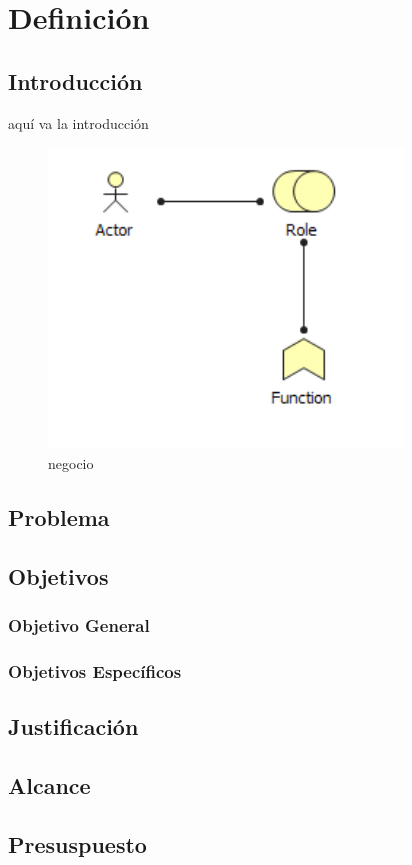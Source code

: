\chapter{Definición}


\section{Introducción}
aquí va la introducción \cite{bol_arq,bol_sw,IC_Takata,IC_Ishihara}

\begin{figure}[th!]
	\centering
	\includegraphics[width=0.7\linewidth]{arquitectura/img/imagen}
	\caption{negocio}
	\label{fig:imagen}
\end{figure}


\newpage

\section{Problema}

\newpage

\section{Objetivos}

\subsection{Objetivo General}

\subsection{Objetivos Específicos}

\newpage

\section{Justificación}

\newpage

\section{Alcance}

\newpage

\section{Presuspuesto}